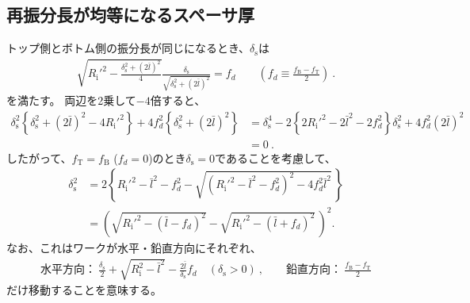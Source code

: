 \subsection{再振分長が均等になるスペーサ厚}
トップ側とボトム側の振分長が同じになるとき、$\delta_\mathrm s$は
\begin{align*}
  \sqrt{R_\mathrm i'^2-\frac{\delta_\mathrm s^2+(2\bar l)^2}4}\frac{\delta_\mathrm s}{\sqrt{\delta_\mathrm s^2+(2\bar l)^2}} = f_d \qquad
  \left(f_d \equiv \frac{f_\mathrm B-f_\mathrm T}2\right)\ .
\end{align*}
を満たす。
両辺を2乗して$-4$倍すると、
\begin{align*}
  \delta_\mathrm s^2\left\{\delta_\mathrm s^2+(2\bar l)^2-4R_\mathrm i'^2\right\}+4f_d^2\left\{\delta_\mathrm s^2+(2\bar l)^2\right\}
  & = \delta_\mathrm s^4-2\left\{2R_\mathrm i'^2-2\bar l^2-2f_d^2\right\}\delta_\mathrm s^2+4f_d^2(2\bar l)^2\\
  & = 0\ .
\end{align*}
したがって、$f_\mathrm T = f_\mathrm B$ ($f_d = 0$)のとき$\delta_\mathrm s = 0$であることを考慮して、
\begin{align*}
  \delta_\mathrm s^2
  &= 2\left\{
       R_\mathrm i'^2-\bar l^2-f_d^2-\sqrt{\left(R_\mathrm i'^2-\bar l^2-f_d^2\right)^2-4f_d^2\bar l^2}\,
     \right\}\\
  &= \left(\sqrt{R_\mathrm i'^2-(\bar l-f_d)^2}-\sqrt{R_\mathrm i'^2-(\bar l+f_d)^2}\,\right)^2.
\end{align*}
なお、これはワークが水平・鉛直方向にそれぞれ、
\begin{align*}
  \text{水平方向：}~\frac{\delta_\mathrm s}2+\sqrt{R_\mathrm i^2-\bar l^2}-\frac{2\bar l}{\delta_\mathrm s}f_d\quad(\delta_\mathrm s>0)\ , \qquad
  \text{鉛直方向：}~\frac{f_\mathrm B-f_\mathrm T}2
\end{align*}
だけ移動することを意味する。

